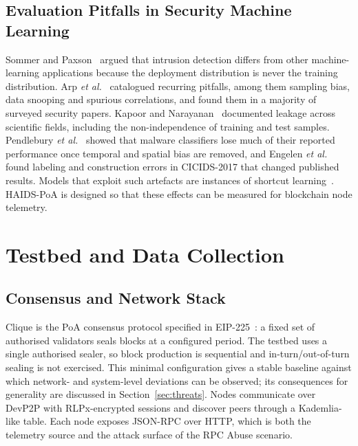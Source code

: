 \documentclass[journal]{IEEEtran}
\begin{document}
\subsection{Evaluation Pitfalls in Security Machine Learning}
Sommer and Paxson~\cite{sommer2010} argued that intrusion detection differs from other machine-learning applications because the deployment distribution is never the training distribution. Arp \emph{et al.}~\cite{arp2022} catalogued recurring pitfalls, among them sampling bias, data snooping and spurious correlations, and found them in a majority of surveyed security papers. Kapoor and Narayanan~\cite{kapoor2023} documented leakage across scientific fields, including the non-independence of training and test samples. Pendlebury \emph{et al.}~\cite{pendlebury2019} showed that malware classifiers lose much of their reported performance once temporal and spatial bias are removed, and Engelen \emph{et al.}~\cite{engelen2021} found labeling and construction errors in CICIDS-2017 that changed published results. Models that exploit such artefacts are instances of shortcut learning~\cite{geirhos2020}. HAIDS-PoA is designed so that these effects can be measured for blockchain node telemetry.

\section{Testbed and Data Collection}\label{sec:testbed}
\subsection{Consensus and Network Stack}
Clique is the PoA consensus protocol specified in EIP-225~\cite{eip225}: a fixed set of authorised validators seals blocks at a configured period. The testbed uses a single authorised sealer, so block production is sequential and in-turn/out-of-turn sealing is not exercised. This minimal configuration gives a stable baseline against which network- and system-level deviations can be observed; its consequences for generality are discussed in Section~\ref{sec:threats}. Nodes communicate over DevP2P with RLPx-encrypted sessions and discover peers through a Kademlia-like table. Each node exposes JSON-RPC over HTTP, which is both the telemetry source and the attack surface of the RPC Abuse scenario.
\end{document}
